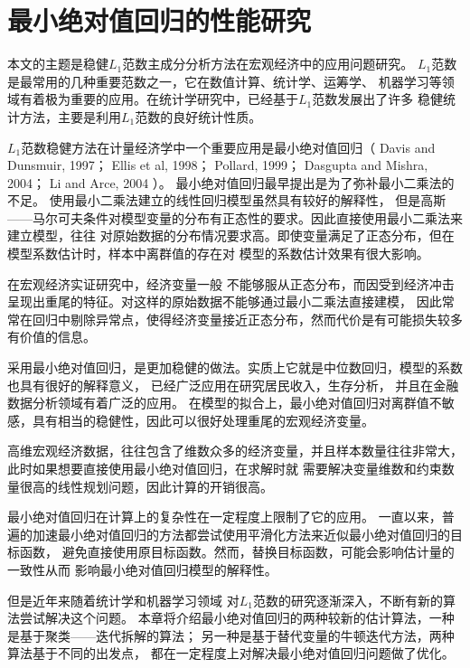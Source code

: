 \section{最小绝对值回归的性能研究}\label{chapter3}

本文的主题是稳健$L_1$范数主成分分析方法在宏观经济中的应用问题研究。
$L_1$范数是最常用的几种重要范数之一，它在数值计算、统计学、运筹学、
机器学习等领域有着极为重要的应用。在统计学研究中，已经基于$L_1$范数发展出了许多
稳健统计方法\cite{dodge2012statistical}，主要是利用$L_1$范数的良好统计性质。

$L_1$范数稳健方法在计量经济学中一个重要应用是最小绝对值回归（
Davis and Dunsmuir, 1997\cite{davis1997least}；
Ellis et al, 1998\cite{ellis1998instability}；
Pollard, 1999\cite{pollard1991asymptotics}；
Dasgupta and Mishra, 2004\cite{dasgupta2004least}；
Li and Arce, 2004\cite{li2004maximum}
）。
最小绝对值回归最早提出是为了弥补最小二乘法的不足。
使用最小二乘法建立的线性回归模型虽然具有较好的解释性，
但是高斯——马尔可夫条件对模型变量的分布有正态性的要求。因此直接使用最小二乘法来建立模型，往往
对原始数据的分布情况要求高。即使变量满足了正态分布，但在模型系数估计时，样本中离群值的存在对
模型的系数估计效果有很大影响。

在宏观经济实证研究中，经济变量一般
不能够服从正态分布，而因受到经济冲击呈现出重尾的特征。对这样的原始数据不能够通过最小二乘法直接建模，
因此常常在回归中剔除异常点，使得经济变量接近正态分布，然而代价是有可能损失较多有价值的信息。

采用最小绝对值回归，是更加稳健的做法。实质上它就是中位数回归，模型的系数也具有很好的解释意义，
已经广泛应用在研究居民收入\cite{dasgupta2004least}，生存分析\cite{ying1995survival}，
并且在金融数据分析领域有着广泛的应用\cite{dasgupta2004least}。
在模型的拟合上，最小绝对值回归对离群值不敏感，具有相当的稳健性，因此可以很好处理重尾的宏观经济变量。

高维宏观经济数据，往往包含了维数众多的经济变量，并且样本数量往往非常大，
此时如果想要直接使用最小绝对值回归，在求解时就
需要解决变量维数和约束数量很高的线性规划问题，因此计算的开销很高。

最小绝对值回归在计算上的复杂性在一定程度上限制了它的应用。
一直以来，普遍的加速最小绝对值回归的方法都尝试使用平滑化方法来近似最小绝对值回归的目标函数，
避免直接使用原目标函数。然而，替换目标函数，可能会影响估计量的一致性从而
影响最小绝对值回归模型的解释性。

但是近年来随着统计学和机器学习领域
对$L_1$范数的研究逐渐深入，不断有新的算法尝试解决这个问题。
本章将介绍最小绝对值回归的两种较新的估计算法，一种是基于聚类——迭代拆解的算法；
另一种是基于替代变量的牛顿迭代方法，两种算法基于不同的出发点，
都在一定程度上对解决最小绝对值回归问题做了优化。

